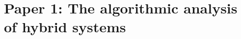 \section{Paper 1: The algorithmic analysis of hybrid systems \cite{Alur:95}} \label{sec:paper1}




